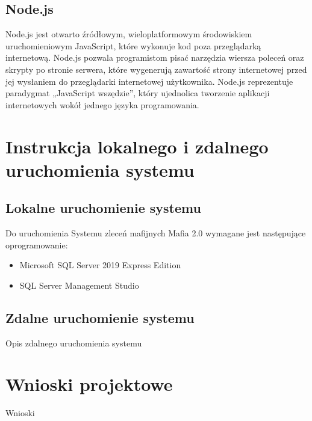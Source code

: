 \documentclass[12pt,a4paper]{article}
\begin{document}
		\subsection{Node.js}
			Node.js jest otwarto źródłowym, wieloplatformowym środowiskiem uruchomieniowym JavaScript, które wykonuje kod poza przeglądarką internetową. Node.js pozwala programistom pisać 					narzędzia wiersza poleceń oraz skrypty po stronie serwera, które wygenerują zawartość strony internetowej przed jej wysłaniem do przeglądarki internetowej użytkownika. Node.js 					reprezentuje paradygmat „JavaScript wszędzie”, który ujednolica tworzenie aplikacji internetowych wokół jednego języka programowania. 
		
	\section{Instrukcja lokalnego i zdalnego uruchomienia systemu}
		\subsection{Lokalne uruchomienie systemu}
			Do uruchomienia Systemu zleceń mafijnych Mafia 2.0 wymagane jest następujące oprogramowanie:
			\begin{itemize}
				\item Microsoft SQL Server 2019 Express Edition
				\item SQL Server Management Studio
			\end{itemize}
		\subsection{Zdalne uruchomienie systemu}
			Opis zdalnego uruchomienia systemu
	
	\section{Wnioski projektowe}
		Wnioski
\end{document}
